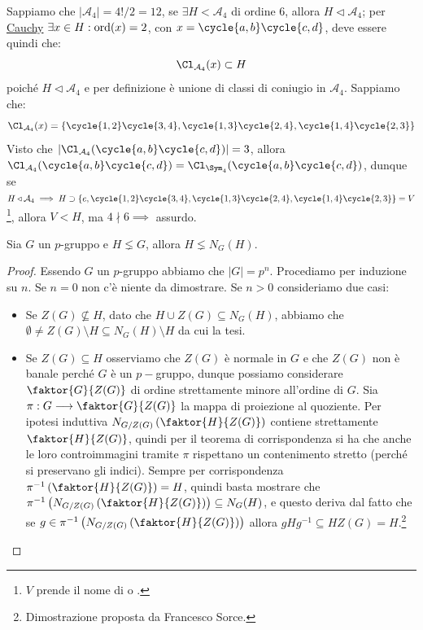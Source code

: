 \documentclass[11pt]{scrartcl}
\begin{document}
\begin{example}
    Sappiamo che $|\mathcal{A}_4| = 4!/2 = 12$, se $\exists H < \mathcal{A}_4$ di ordine $6$, allora $H \triangleleft \mathcal{A}_4$; per \hyperref[p:Cauchy]{Cauchy}
    $\exists x \in H : \operatorname{ord}(x) = 2$, con $x = \cycle{a,b}\cycle{c,d}$, deve essere quindi che:
        \[ \Cl_{\mathcal{A}_4}(x) \subset H
            \]
    poiché $H \triangleleft \mathcal{A}_4$ e per definizione è unione di classi di coniugio in $\mathcal{A}_4$. Sappiamo che:
        \[ \Cl_{\mathcal{A}_4}(x) = \{ \cycle{1,2}\cycle{3,4}, \cycle{1,3}\cycle{2,4}, \cycle{1,4}\cycle{2,3}\}
            \]
    Visto che $|\Cl_{\mathcal{A}_4}(\cycle{a,b} \cycle{c,d})| = 3$, allora $\Cl_{\mathcal{A}_4}(\cycle{a,b} \cycle{c,d}) = \Cl_{\Sym_4}(\cycle{a,b} \cycle{c,d})$,
    dunque se $H \triangleleft \mathcal{A}_4 \implies H \supset \{e, \cycle{1,2}\cycle{3,4}, \cycle{1,3}\cycle{2,4}, \cycle{1,4}\cycle{2,3}\} = V$ \footnote{$V$ prende il nome di  o .},
    allora $V < H$, ma $4 \nmid 6 \implies$ assurdo.
\end{example}

\begin{lemma}
    \label{l:1.95}
    Sia $G$ un $p$-gruppo e $H \lneq G$, allora $H \lneq N_G(H)$.
\end{lemma}

\begin{proof}
    Essendo $G$ un $p$-gruppo abbiamo che $|G|=p^n$. Procediamo per induzione su $n$. Se $n=0$ non c'è niente da dimostrare. Se $n>0$ consideriamo due casi: 
    \begin{itemize}
        \item Se $Z(G)\not\subseteq H$, dato che $H\cup Z(G)\subseteq N_G(H)$, abbiamo che $\emptyset\neq Z(G)\setminus H\subseteq N_G(H)\setminus H$ da cui la tesi.
        \item Se $Z(G)\subseteq H$ osserviamo che $Z(G)$ è normale in $G$ e che $Z(G)$ non è banale perché $G$ è un $p-$gruppo, dunque possiamo considerare $\faktor{G}{Z(G)}$
        di ordine strettamente minore all'ordine di $G$. Sia $\pi:G \longrightarrow \faktor{G}{Z(G)}$ la mappa di proiezione al quoziente. Per ipotesi induttiva $N_{G/Z(G)}\left(\faktor{H}{Z(G)}\right)$ contiene strettamente $\faktor{H}{Z(G)}$, quindi per il teorema di corrispondenza si ha che anche
        le loro controimmagini tramite $\pi$ rispettano un contenimento stretto (perché si preservano gli indici). Sempre per corrispondenza $\pi^{-1}\left(\faktor{H}{Z(G)}\right)=H$, quindi basta mostrare che $\pi^{-1}\left(N_{G/Z(G)}\left(\faktor{H}{Z(G)}\right)\right)\subseteq N_G(H)$, e questo deriva 
        dal fatto che se $g\in \pi^{-1}\left(N_{G/Z(G)}\left(\faktor{H}{Z(G)}\right)\right)$ allora $gHg^{-1}\subseteq HZ(G)=H$.\footnote{Dimostrazione proposta da Francesco Sorce.}
    \end{itemize}
\end{proof}
\end{document}
